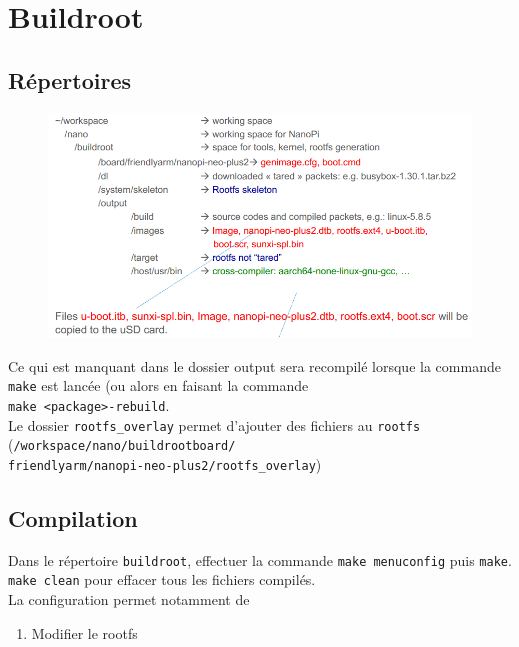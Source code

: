 \documentclass[resume]{subfiles}
\begin{document}
\section{Buildroot}
\subsection{Répertoires}
\begin{figure}[H]
\centering
\includegraphics[width=0.9\columnwidth]{img_1.png}
\end{figure}
Ce qui est manquant dans le dossier output sera recompilé lorsque la commande \verb!make! est lancée (ou alors en faisant la commande\\
\verb!make <package>-rebuild!.\\
Le dossier \verb!rootfs_overlay! permet d'ajouter des fichiers au \verb!rootfs!\\
(\verb!/workspace/nano/buildrootboard/!\\
\verb!friendlyarm/nanopi-neo-plus2/rootfs_overlay!)
\subsection{Compilation}
Dans le répertoire \verb!buildroot!, effectuer la commande \verb!make menuconfig! puis \verb!make!. \verb!make clean! pour effacer tous les fichiers compilés.\\
La configuration permet notamment de 
\begin{enumerate}
\item Modifier le rootfs
\end{enumerate}
\end{document}
